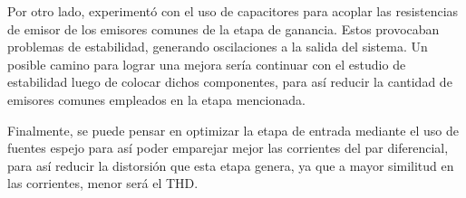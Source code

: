 Por otro lado, experimentó con el uso de capacitores para acoplar las resistencias de emisor de los emisores comunes de la etapa de ganancia. Estos provocaban problemas de estabilidad, generando oscilaciones a la salida del sistema. Un posible camino para lograr una mejora sería continuar con el estudio de estabilidad luego de colocar dichos componentes, para así reducir la cantidad de emisores comunes empleados en la etapa mencionada.

Finalmente, se puede pensar en optimizar la etapa de entrada mediante el uso de fuentes espejo para así poder emparejar mejor las corrientes del par diferencial, para así reducir la distorsión que esta etapa genera, ya que a mayor similitud en las corrientes, menor será el THD.